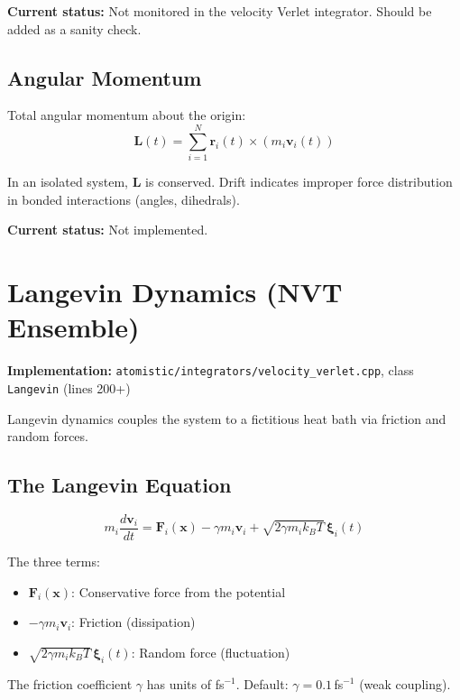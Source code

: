 \documentclass[11pt]{article}
\begin{document}
\textbf{Current status:} Not monitored in the velocity Verlet integrator. Should be added as a sanity check.

\subsection{Angular Momentum}

Total angular momentum about the origin:
\begin{equation}
\mathbf{L}(t) = \sum_{i=1}^{N} \mathbf{r}_i(t) \times (m_i \mathbf{v}_i(t))
\end{equation}

In an isolated system, $\mathbf{L}$ is conserved. Drift indicates improper force distribution in bonded interactions (angles, dihedrals).

\textbf{Current status:} Not implemented.

\section{Langevin Dynamics (NVT Ensemble)}

\textbf{Implementation:} \texttt{atomistic/integrators/velocity\_verlet.cpp}, class \texttt{Langevin} (lines 200+)

Langevin dynamics couples the system to a fictitious heat bath via friction and random forces.

\subsection{The Langevin Equation}

\begin{equation}
m_i \frac{d\mathbf{v}_i}{dt} = \mathbf{F}_i(\mathbf{x}) - \gamma m_i \mathbf{v}_i + \sqrt{2\gamma m_i k_B T}\,\boldsymbol{\xi}_i(t)
\end{equation}

The three terms:
\begin{itemize}
\item $\mathbf{F}_i(\mathbf{x})$: Conservative force from the potential
\item $-\gamma m_i \mathbf{v}_i$: Friction (dissipation)
\item $\sqrt{2\gamma m_i k_B T}\,\boldsymbol{\xi}_i(t)$: Random force (fluctuation)
\end{itemize}

The friction coefficient $\gamma$ has units of fs$^{-1}$. Default: $\gamma = 0.1$\,fs$^{-1}$ (weak coupling).
\end{document}
